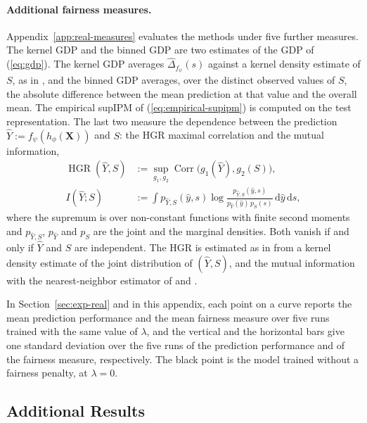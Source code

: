 \documentclass{article} %
\begin{document}
\paragraph{Additional fairness measures.}  Appendix~\ref{app:real-measures} evaluates the methods under five further measures.  The kernel GDP and the binned GDP are two estimates of the GDP of (\ref{eq:gdp}). The kernel GDP averages $\widehat{\Delta}_{f_{\psi}}(s)$ against a kernel density estimate of $S$, as in \citet{kong2025fair}, and the binned GDP averages, over the distinct observed values of $S$, the absolute difference between the mean prediction at that value and the overall mean.  The empirical supIPM of (\ref{eq:empirical-supipm}) is computed on the test representation. The last two measure the dependence between the prediction $\hat{Y}:=f_{\psi}(h_{\phi}(\mathbf{X}))$ and $S$: the HGR maximal correlation \citep{mary2019fairness} and the mutual information,
\begin{equation}
\begin{aligned}
  \operatorname{HGR}(\hat{Y},S)
  &:=\sup_{g_1,g_2}\operatorname{Corr}\bigl(g_1(\hat{Y}),g_2(S)\bigr),\\
  I(\hat{Y};S)
  &:=\int p_{\hat{Y},S}(\hat{y},s)\log\frac{p_{\hat{Y},S}(\hat{y},s)}{p_{\hat{Y}}(\hat{y})\,p_S(s)}\,\mathrm{d}\hat{y}\,\mathrm{d}s,
\end{aligned}
\label{eq:hgr-mi}
\end{equation}
where the supremum is over non-constant functions with finite second moments and $p_{\hat{Y},S}$, $p_{\hat{Y}}$ and $p_S$ are the joint and the marginal densities.  Both vanish if and only if $\hat{Y}$ and $S$ are independent.  The HGR is estimated as in \citet{mary2019fairness} from a kernel density estimate of the joint distribution of $(\hat{Y},S)$, and the mutual information with the nearest-neighbor estimator of \citet{kraskov2004estimating} and \citet{ross2014mutual}.


In Section~\ref{sec:exp-real} and in this appendix, each point on a curve reports the mean prediction performance and the mean fairness measure over five runs trained with the same value of $\lambda$, and the vertical and the horizontal bars give one standard deviation over the five runs of the prediction performance and of the fairness measure, respectively.  The black point is the model trained without a fairness penalty, at $\lambda=0$.
\subsection{Additional Results}
\label{app:real-additional}
\end{document}
